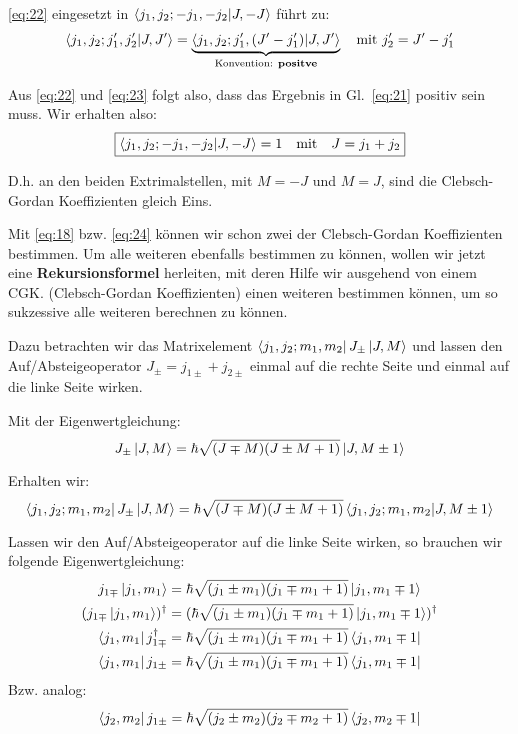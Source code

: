 \eqref{eq:22} eingesetzt in \(\braket{j_1,j_2;-j_1,-j_2}{J,-J}\) führt zu:
\begin{align}
  \label{eq:23}
  \braket{j_1,j_2;j_1',j_2'}{J,J'}
  =\underbrace{\braket{j_1,j_2;j_1',(J'-j_1')}{J,J'}}
   _{\text{Konvention: \textbf{positve}}}
   \quad \text{mit }  j_2'=J'-j_1'
\end{align}

Aus \eqref{eq:22} und \eqref{eq:23} folgt also, dass das Ergebnis in
Gl.~\eqref{eq:21} positiv sein muss. Wir erhalten also:
\begin{equation}
  \label{eq:24}
  \boxed{\braket{j_1,j_2;-j_1,-j_2}{J,-J}=1 \quad \text{mit}\quad J=j_1+j_2}
\end{equation}

D.h. an den beiden Extrimalstellen, mit \(M=-J\) und \(M=J\), sind die
Clebsch-Gordan Koeffizienten gleich Eins.

Mit \eqref{eq:18} bzw. \eqref{eq:24} können wir schon zwei der Clebsch-Gordan
Koeffizienten bestimmen. Um alle weiteren ebenfalls bestimmen zu können, wollen
wir jetzt eine \textbf{Rekursionsformel} herleiten, mit deren Hilfe wir
ausgehend von einem CGK. (Clebsch-Gordan Koeffizienten) einen weiteren bestimmen
können, um so sukzessive alle weiteren berechnen zu können. 

Dazu betrachten wir das Matrixelement \(\left\langle j_1,j_2;m_1,m_2 \right|J_{\pm}\left| J,M \right\rangle\)
und lassen den Auf/Absteigeoperator \(J_{\pm}=j_{1\pm}+j_{2\pm}\) einmal auf die
rechte Seite und einmal auf die linke Seite wirken.

Mit der Eigenwertgleichung:
\begin{equation}
  \label{eq:25}
  J_{\pm}\left| J,M \right\rangle=\hbar\sqrt{(J\mp M)(J\pm M+1)}\left| J,M\pm 1 \right\rangle
\end{equation}

Erhalten wir:
\begin{equation}
  \label{eq:26}
  \bra{j_1,j_2;m_1,m_2}J_{\pm}\ket{J,M}=\hbar\sqrt{(J\mp M)
    (J\pm M+1)}\braket{j_1,j_2;m_1,m_2}{J,M\pm 1}
\end{equation}

Lassen wir den Auf/Absteigeoperator auf die linke Seite wirken, so brauchen wir
folgende Eigenwertgleichung:
\begin{align}
  \label{eq:27}
   j_{1\mp}\left| j_1,m_1 \right\rangle&=\hbar\sqrt{(j_1\pm m_1)(j_1\mp m_1+1)}
   \left| j_1,m_1\mp1 \right\rangle\notag\\
   (j_{1\mp}\left| j_1,m_1 \right\rangle)^\dagger&=(\hbar\sqrt{(j_1\pm m_1)(j_1\mp m_1+1)}
   \left| j_1,m_1\mp1 \right\rangle)^\dagger\notag\\
   \left\langle j_1,m_1 \right|j_{1\mp}^\dagger&=\hbar\sqrt{(j_1\pm m_1)(j_1\mp m_1+1)}
   \left\langle j_1,m_1\mp1 \right|\notag\\
   \left\langle j_1,m_1 \right|j_{1\pm}&=\hbar\sqrt{(j_1\pm m_1)(j_1\mp m_1+1)}
   \left\langle j_1,m_1\mp 1 \right|
\end{align}
Bzw. analog:
\begin{equation}
  \label{eq:28}
  \left\langle j_2,m_2 \right|j_{1\pm}=\hbar\sqrt{(j_2\pm m_2)(j_2\mp m_2+1)}
   \left\langle j_2,m_2\mp 1 \right|
\end{equation}

